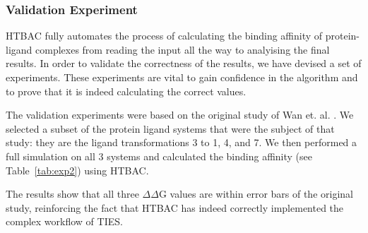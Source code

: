 




\subsubsection{Validation Experiment}

HTBAC fully automates the process of calculating the binding affinity of
protein-ligand complexes from reading the input all the way to analyising the
final results. In order to validate the correctness of the results, we have
devised a set of experiments. These experiments are vital to gain confidence
in the algorithm and to prove that it is indeed calculating the correct values.

The validation experiments were based on the original study of Wan et. al.
\cite{Wan2017brd4}. We selected a subset of the protein ligand systems that
were the subject of that study: they are the ligand transformations 3 to 1, 4,
and 7. We then performed a full simulation on all 3 systems and calculated the
binding affinity (see Table~\ref{tab:exp2}) using HTBAC.

The results show that all three $\Delta \Delta$G values are within error bars
of the original study, reinforcing the fact that HTBAC has indeed correctly
implemented the complex workflow of TIES.

